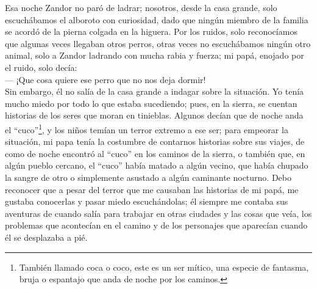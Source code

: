 Esa noche Zandor no paró de ladrar; nosotros, desde la casa grande, solo escuchábamos el alboroto con curiosidad, dado que ningún miembro de la familia se acordó de la pierna colgada en la higuera. 
Por los ruidos, solo reconocíamos que algunas veces llegaban otros perros, otras veces no escuchábamos ningún otro animal, solo a Zandor ladrando con mucha rabia y fuerza; mi papá, enojado por el ruido, solo decía:\\\indent
--- ¡Que cosa quiere ese perro que no nos deja dormir!\\\indent
Sin embargo, él no salía de la casa grande a indagar sobre la situación. 
Yo tenía mucho miedo por todo lo que estaba sucediendo; pues, en la sierra, se cuentan historias de los seres que moran en tinieblas.
Algunos decían que de noche anda el ``cuco''\footnote{También llamado coca o coco, este es un ser mítico, una especie de fantasma, bruja o espantajo que anda de noche por los caminos.}, y los niños temían un terror extremo a ese ser; para empeorar la situación, mi papa tenía la costumbre de contarnos historias sobre sus viajes, de como de noche encontró al ``cuco'' en los caminos de la sierra, o también que, en algún pueblo cercano, el ``cuco'' había matado a algún vecino, que había chupado la sangre de otro o simplemente asustado a algún caminante nocturno. Debo reconocer que a pesar del terror que me causaban las historias de mi papá, me gustaba conocerlas y pasar miedo escuchándolas; él siempre me contaba sus aventuras de cuando salía para trabajar en otras ciudades y las cosas que veía, los problemas que acontecían en el camino y de los personajes que aparecían cuando él se desplazaba a pié.

